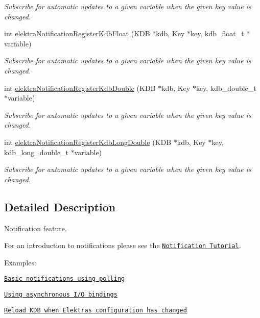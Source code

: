 \begin{DoxyCompactItemize}
\begin{DoxyCompactList}\small\item\em Subscribe for automatic updates to a given variable when the given key value is changed. \end{DoxyCompactList}\item 
int \hyperlink{group__kdbnotification_ga6c83faa92467ece80470e7898dc7d08b}{elektra\+Notification\+Register\+Kdb\+Float} (K\+DB $\ast$kdb, Key $\ast$key, kdb\+\_\+float\+\_\+t $\ast$variable)
\begin{DoxyCompactList}\small\item\em Subscribe for automatic updates to a given variable when the given key value is changed. \end{DoxyCompactList}\item 
int \hyperlink{group__kdbnotification_ga99a142068ed614d7cb8b177e3b6920e4}{elektra\+Notification\+Register\+Kdb\+Double} (K\+DB $\ast$kdb, Key $\ast$key, kdb\+\_\+double\+\_\+t $\ast$variable)
\begin{DoxyCompactList}\small\item\em Subscribe for automatic updates to a given variable when the given key value is changed. \end{DoxyCompactList}\item 
int \hyperlink{group__kdbnotification_gaf54980fff32069a7a3a1e495e7e8013f}{elektra\+Notification\+Register\+Kdb\+Long\+Double} (K\+DB $\ast$kdb, Key $\ast$key, kdb\+\_\+long\+\_\+double\+\_\+t $\ast$variable)
\begin{DoxyCompactList}\small\item\em Subscribe for automatic updates to a given variable when the given key value is changed. \end{DoxyCompactList}\end{DoxyCompactItemize}


\subsection{Detailed Description}
Notification feature. 

For an introduction to notifications please see the \href{doc_tutorials_notifications_md.html}{\tt Notification Tutorial}.

Examples\+:


\begin{DoxyItemize}
\item \href{https://www.libelektra.org/examples/notificationpolling}{\tt Basic notifications using polling}
\item \href{https://www.libelektra.org/examples/notificationasync}{\tt Using asynchronous I/O bindings}
\item \href{https://www.libelektra.org/examples/notificationreload}{\tt Reload K\+DB when Elektra\textquotesingle{}s configuration has changed}
\end{DoxyItemize}

